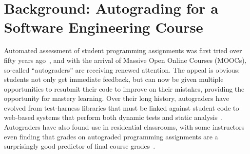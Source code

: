 \section{Background: Autograding for a Software Engineering Course}

Automated assessment of student programming assignments was first tried
over fifty years ago~\cite{hollingsworth60}, and with the arrival of
Massive Open Online Courses (MOOCs), so-called ``autograders'' are
receiving renewed attention.  The appeal is obvious: students not only
get immediate feedback, but can now be given multiple opportunities to
resubmit their code to improve on their mistakes, providing the
opportunity for mastery learning.  Over their long history, autograders
have evolved from test-harness libraries that must be linked against
student code to web-based systems that perform both dynamic tests and static
analysis~\cite{douce-2005-autograding-survey}.  Autograders have also
found use in residential classrooms, with some instructors even finding
that grades on autograded programming assignments are a surprisingly good
predictor of final course grades~\cite{navrat2014}.


